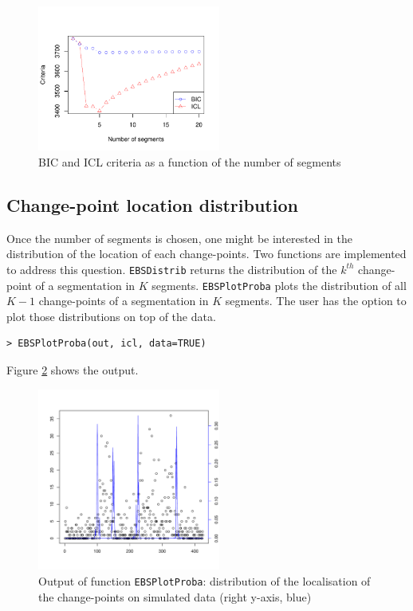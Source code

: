\documentclass{bioinfo}
\begin{document}
\begin{methods}
\begin{verbatim}
\end{verbatim}


\begin{figure}[!h]%
\centerline{\includegraphics[width=6cm]{icl-bic.pdf}}
\caption{BIC and ICL criteria as a function of the number of segments} \label{fig:01}
\end{figure}






\subsection{Change-point location distribution}

Once the number of segments is chosen, one might be interested in the distribution of the location of each change-points. Two functions are implemented to address this question. \texttt{EBSDistrib} returns the distribution of the $k^{th}$ change-point of a segmentation in $K$ segments. \texttt{EBSPlotProba} plots the distribution of all $K\!-\!1$ change-points of a segmentation in $K$ segments. The user has the option to plot those distributions on top of the data. 
\begin{verbatim}
> EBSPlotProba(out, icl, data=TRUE)
\end{verbatim}

Figure \ref{fig:02} shows the output. 

\begin{figure}[!h]%
\centerline{\includegraphics[width=6cm]{my-segmentation.pdf}}
\caption{Output of function \texttt{EBSPlotProba}: distribution of the localisation of the change-points on simulated data (right y-axis, blue)}\label{fig:02}
\end{figure}





\end{methods}
\end{document}
